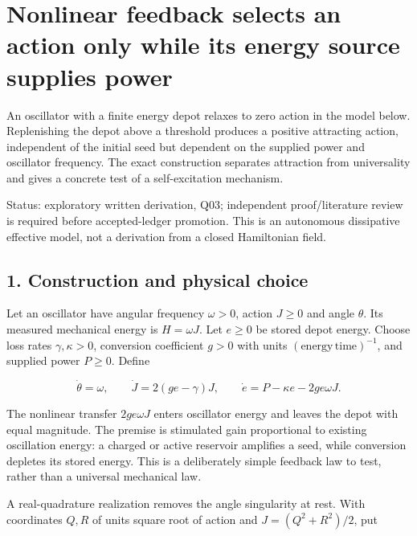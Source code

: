 \documentclass[11pt,a4paper]{article}
\begin{document}
\hypertarget{nonlinear-feedback-selects-an-action-only-while-its-energy-source-supplies-power}{%
\section{Nonlinear feedback selects an action only while its energy
source supplies
power}\label{nonlinear-feedback-selects-an-action-only-while-its-energy-source-supplies-power}}

An oscillator with a finite energy depot relaxes to zero action in the
model below. Replenishing the depot above a threshold produces a
positive attracting action, independent of the initial seed but
dependent on the supplied power and oscillator frequency. The exact
construction separates attraction from universality and gives a concrete
test of a self-excitation mechanism.

Status: exploratory written derivation, Q03; independent
proof/literature review is required before accepted-ledger promotion.
This is an autonomous dissipative effective model, not a derivation from
a closed Hamiltonian field.

\hypertarget{construction-and-physical-choice}{%
\subsection{1. Construction and physical
choice}\label{construction-and-physical-choice}}

Let an oscillator have angular frequency \(\omega>0\), action \(J\ge0\)
and angle \(\theta\). Its measured mechanical energy is \(H=\omega J\).
Let \(e\ge0\) be stored depot energy. Choose loss rates
\(\gamma,\kappa>0\), conversion coefficient \(g>0\) with units
\((\text{energy}\,\text{time})^{-1}\), and supplied power \(P\ge0\).
Define

\[\dot\theta=\omega,\qquad
\dot J=2(ge-\gamma)J,\qquad
\dot e=P-\kappa e-2g e\omega J. \tag{1}\]

The nonlinear transfer \(2ge\omega J\) enters oscillator energy and
leaves the depot with equal magnitude. The premise is stimulated gain
proportional to existing oscillation energy: a charged or active
reservoir amplifies a seed, while conversion depletes its stored energy.
This is a deliberately simple feedback law to test, rather than a
universal mechanical law.

A real-quadrature realization removes the angle singularity at rest.
With coordinates \(Q,R\) of units square root of action and
\(J=(Q^2+R^2)/2\), put
\end{document}
